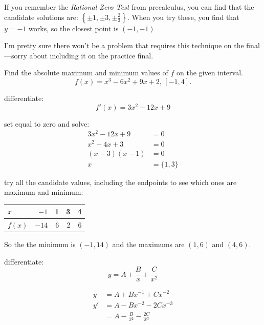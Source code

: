 \documentclass[fleqn,addpoints]{exam}
\begin{document}
\begin{questions}
\begin{solution}
If you remember the {\em Rational Zero Test} from precalculus, you can find that the candidate solutions are: 
$\left\{\pm 1, \pm 3, \pm \frac{2}{3} \right\}$. When you try these, you find that $y = -1$ works, so the 
closest point is $(-1, -1)$

I'm pretty sure there won't be a problem that requires this technique on the final---sorry about including it on the practice final.

\end{solution}


\question
Find the absolute maximum and minimum values of $f$ on the given interval. 
\[
  f(x) = x^3 - 6x^2 + 9x + 2 \text{, } [-1, 4].
\]

\begin{solution}
differentiate:
\[
  f'(x) = 3x^2 - 12x + 9
\]

set equal to zero and solve:
\begin{align*}
  3x^2 - 12x + 9 &= 0 \\
  x^2 - 4x + 3 &= 0 \\
  (x - 3)(x - 1) &= 0 \\
  x &= \{1, 3\}
\end{align*}

try all the candidate values, including the endpoints to see which ones are maximum and minimum:

\begin{tabular}{lrrrr}
\toprule
$x$  & $-1$    & 1 & 3 & 4 \\
\midrule
$f(x)$ & $-14$ & 6 & 2 & 6 \\
\bottomrule
\end{tabular}

So the the minimum is $(-1, 14)$ and the maximums are $(1, 6)$ and $(4, 6)$.

\end{solution}

\question
differentiate:
\[
  y = A + \frac{B}{x} + \frac{C}{x^2}
\]

\begin{solution}
\begin{align*}
  y &= A + Bx^{-1} + Cx^{-2} \\
  y' &= A - Bx^{-2} - 2Cx^{-3} \\
     &= A - \frac{B}{x^2} - \frac{2C}{x^3} \\
\end{align*}


\end{solution}
\end{questions}
\end{document}
